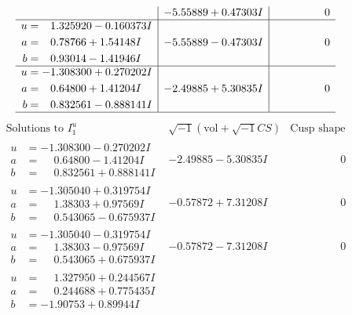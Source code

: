 \documentclass[1p]{elsarticle_modified}
\theoremstyle{definition}
\newcommand{\I}{\sqrt{-1}}
\begin{document}
$$\begin{array}{c|c|c}
 & -5.55889 + 0.47303 I & \phantom{-0.000000 } 0 \\ \hline\begin{aligned}
u &= \phantom{-}1.325920 - 0.160373 I \\
a &= \phantom{-}0.78766 + 1.54148 I \\
b &= \phantom{-}0.93014 - 1.41946 I\end{aligned}
 & -5.55889 - 0.47303 I & \phantom{-0.000000 } 0 \\ \hline\begin{aligned}
u &= -1.308300 + 0.270202 I \\
a &= \phantom{-}0.64800 + 1.41204 I \\
b &= \phantom{-}0.832561 - 0.888141 I\end{aligned}
 & -2.49885 + 5.30835 I & \phantom{-0.000000 } 0\\
 \hline 
 \end{array}$$\newpage$$\begin{array}{c|c|c}  
\text{Solutions to }I^u_{1}& \I (\text{vol} + \sqrt{-1}CS) & \text{Cusp shape}\\
 \hline 
\begin{aligned}
u &= -1.308300 - 0.270202 I \\
a &= \phantom{-}0.64800 - 1.41204 I \\
b &= \phantom{-}0.832561 + 0.888141 I\end{aligned}
 & -2.49885 - 5.30835 I & \phantom{-0.000000 } 0 \\ \hline\begin{aligned}
u &= -1.305040 + 0.319754 I \\
a &= \phantom{-}1.38303 + 0.97569 I \\
b &= \phantom{-}0.543065 - 0.675937 I\end{aligned}
 & -0.57872 + 7.31208 I & \phantom{-0.000000 } 0 \\ \hline\begin{aligned}
u &= -1.305040 - 0.319754 I \\
a &= \phantom{-}1.38303 - 0.97569 I \\
b &= \phantom{-}0.543065 + 0.675937 I\end{aligned}
 & -0.57872 - 7.31208 I & \phantom{-0.000000 } 0 \\ \hline\begin{aligned}
u &= \phantom{-}1.327950 + 0.244567 I \\
a &= \phantom{-}0.244688 + 0.775435 I \\
b &= -1.90753 + 0.89944 I\end{aligned}

\end{array}$$
\end{document}
